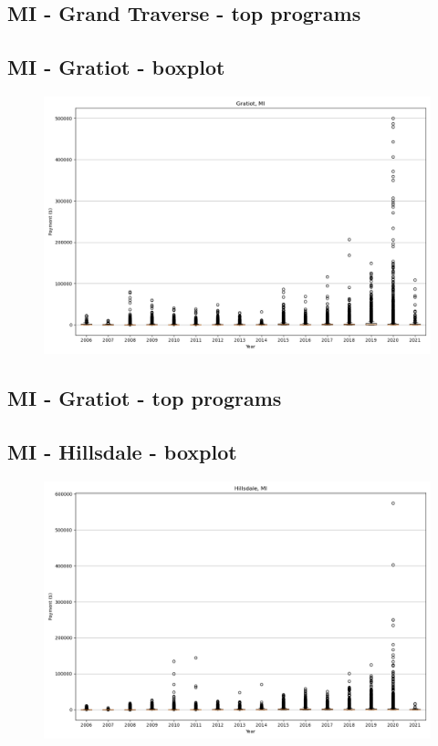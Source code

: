 \subsection*{MI - Grand Traverse - top programs}

\newpage
\subsection*{MI - Gratiot - boxplot}
\begin{figure}[h]
\centering
\includegraphics[width=7in]{../output/boxplots/counties/Gratiot-MI_boxplot.png}
\end{figure}


\subsection*{MI - Gratiot - top programs}

\newpage
\subsection*{MI - Hillsdale - boxplot}
\begin{figure}[h]
\centering
\includegraphics[width=7in]{../output/boxplots/counties/Hillsdale-MI_boxplot.png}
\end{figure}


